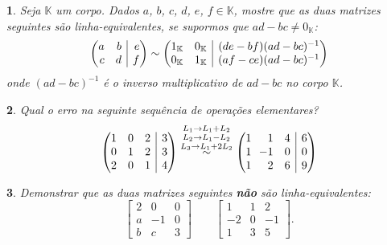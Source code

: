 \documentclass[12pt]{exam}
\makeatletter
\newenvironment{amatrix}[1]{%
  \left(\begin{array}{@{}*{#1}{r}|r@{}}
}{%
  \end{array}\right)
}
\newtheorem{exercicio}{}
\newcommand{\cp}[1]{\mathbb{#1}}
\makeatother
\begin{document}
\begin{exercicio}
  Seja $\cp{K}$ um corpo. Dados $a$, $b$, $c$, $d$, $e$, $f \in \cp{K}$, mostre que as duas matrizes seguintes s\~ao linha-equivalentes, se supormos que $ad - bc \ne 0_{\cp{K}}$:
  \[
    \begin{amatrix}{2}
      a & b & e\\
      c & d & f
    \end{amatrix} \sim \begin{amatrix}{2}
      1_{\cp{K}} & 0_{\cp{K}} & (de - bf)(ad - bc)^{-1}\\
      0_{\cp{K}} & 1_{\cp{K}} & (af - ce)(ad - bc)^{-1}
    \end{amatrix}
  \]
  onde $(ad - bc)^{-1}$ \'e o inverso multiplicativo de $ad - bc$ no corpo $\cp{K}$.
\end{exercicio}

\begin{exercicio}
  Qual o erro na seguinte sequ\^encia de opera\c{c}\~oes elementares?
    \begin{align*}
      \begin{amatrix}{3} 
        1 & 0 & 2 & 3 \\ 
        0 & 1 & 2& 3 \\
        2 & 0 & 1 & 4 \\
      \end{amatrix} 
      \stackrel{L_1 \to L_1+L_2}{
      \stackrel{L_2 \to L_1-L_2}{ 
      \stackrel{L_3 \to  L_1+2L_2}{\sim}}}
      \begin{amatrix}{3} 
      1 & 1 & 4 & 6 \\
      1 & \!\!-1 & 0& 0 \\
      1 & 2 & 6 & 9 
      \end{amatrix}
    \end{align*}
\end{exercicio}

\begin{exercicio}
  Demonstrar que as duas matrizes seguintes \textbf{n\~ao} s\~ao linha-equivalentes:
  \[
    \begin{bmatrix}
      2 & 0 & 0\\
      a & -1 & 0\\
      b & c & 3
    \end{bmatrix} \qquad
    \begin{bmatrix}
      1 & 1 & 2\\
      -2 & 0 & -1\\
      1 & 3 & 5
    \end{bmatrix}.
  \]
\end{exercicio}
\end{document}
